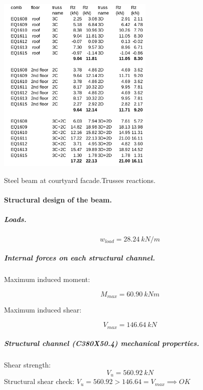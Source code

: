 \begin{table}
  \begin{center}
  \includegraphics[width=75mm]{figures/CD_reactions}
  \end{center}
  \caption{Steel beam at courtyard facade.Trusses reactions.}\label{tb_CD_reactions}
\end{table}

\paragraph{Structural design of the beam.}

\subparagraph{Loads.}

\begin{equation}
  w_{load}= 28.24\ kN/m
\end{equation}

\subparagraph{Internal forces on each structural channel.}

\noindent Maximum induced moment:

\begin{equation}
  M_{max}= 60.90\ kN m
\end{equation}

\noindent Maximum induced shear:

\begin{equation}
  V_{max}= 146.64\ kN
\end{equation}

\subparagraph{Structural channel (C380X50.4) mechanical properties.}

\noindent Shear strength:
\begin{equation}
  V_u= 560.92\ kN 
\end{equation}
\noindent Structural shear check: $V_u = 560.92 > 146.64 = V_{max} \implies OK$

